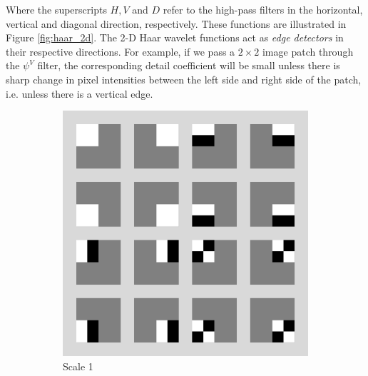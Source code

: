 Where the superscripts $H,V$ and $D$ refer to the high-pass filters in the horizontal, vertical and diagonal direction, respectively.
These functions are illustrated in Figure \ref{fig:haar_2d}.
The 2-D Haar wavelet functions act as \emph{edge detectors} in their respective directions.
For example, if we pass a $2\times 2$ image patch through the $\psi^V$ filter, the corresponding detail coefficient will be small unless there is sharp change in pixel intensities between the left side and right side of the patch, i.e. unless there is a vertical edge.

\begin{figure}
\centering
\begin{subfigure}{0.4\textwidth}
  \includegraphics[width=\textwidth]{Chapter3/Images/haar2_scale1.png}
  \caption{Scale 1}
\end{subfigure}
\begin{subfigure}{0.4\textwidth}

\end{subfigure}
\end{figure}
